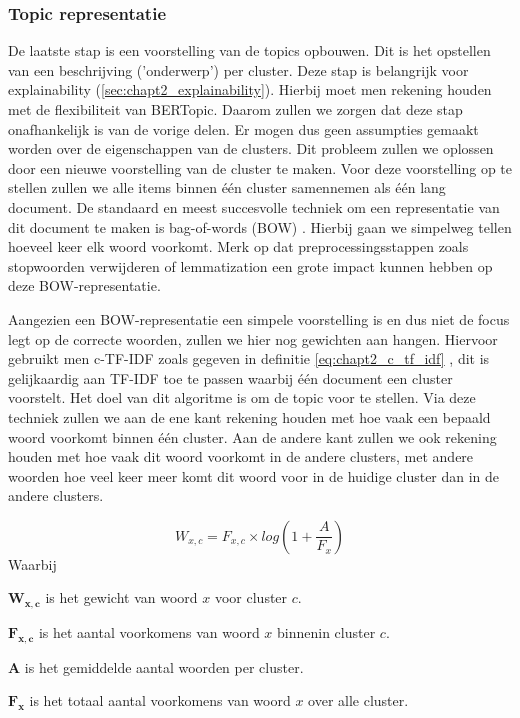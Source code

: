 \subsubsection{Topic representatie}
\label{sub:topic_representatie}
De laatste stap is een voorstelling van de topics opbouwen. Dit is het opstellen van een beschrijving ('onderwerp') per cluster. Deze stap is belangrijk voor explainability (\autoref{sec:chapt2_explainability}).  Hierbij moet men rekening houden met de flexibiliteit van BERTopic. Daarom zullen we zorgen dat deze stap onafhankelijk is van de vorige delen. Er mogen dus geen assumpties gemaakt worden over de eigenschappen van de clusters. Dit probleem zullen we oplossen door een nieuwe voorstelling van de cluster te maken. Voor deze voorstelling op te stellen zullen we alle items binnen één cluster samennemen als één lang document. De standaard en meest succesvolle techniek om een representatie van dit document te maken is bag-of-words (BOW) \cite{bag_of_words_blog}. Hierbij gaan we simpelweg tellen hoeveel keer elk woord voorkomt. Merk op dat preprocessingsstappen zoals stopwoorden verwijderen of lemmatization een grote impact kunnen hebben op deze BOW-representatie.

Aangezien een BOW-representatie een simpele voorstelling is en dus niet de focus legt op de correcte woorden, zullen we hier nog gewichten aan hangen. Hiervoor gebruikt men c-TF-IDF zoals gegeven in definitie \ref{eq:chapt2_c_tf_idf} \cite{bertopic_algo}, dit is gelijkaardig aan TF-IDF toe te passen waarbij één document een cluster voorstelt. Het doel van dit algoritme is om de topic voor te stellen. Via deze techniek zullen we aan de ene kant rekening houden met hoe vaak een bepaald woord voorkomt binnen één cluster. Aan de andere kant zullen we ook rekening houden met hoe vaak dit woord voorkomt in de andere clusters, met andere woorden hoe veel keer meer komt dit woord voor in de huidige cluster dan in de andere clusters.

\begin{equation}
    W_{x,c} = F_{x,c} \times log(1 + \frac{A}{F_x})
    \label{eq:chapt2_c_tf_idf}
\end{equation}
Waarbij
\begin{description}
    \item$\mathbf{W_{x,c}}$ is het gewicht van woord $x$ voor cluster $c$.
    \item$\mathbf{F_{x,c}}$ is het aantal voorkomens van woord $x$ binnenin cluster $c$.
    \item$\mathbf{A}$ is het gemiddelde aantal woorden per cluster.
    \item$\mathbf{F_{x}}$ is het totaal aantal voorkomens van woord $x$ over alle cluster.
\end{description}

